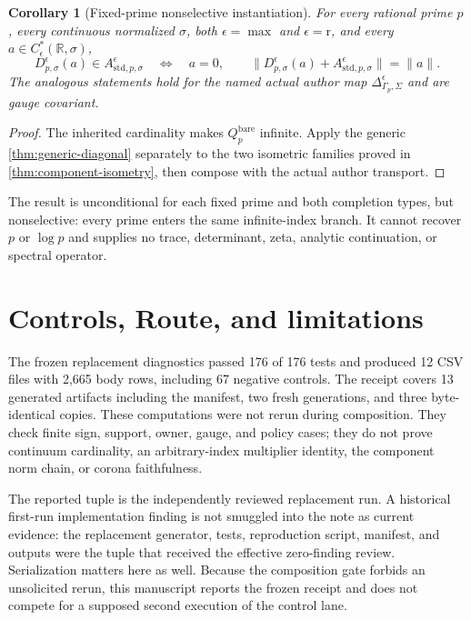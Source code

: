 \documentclass[11pt]{article}
\newtheorem{corollary}[theorem]{Corollary}
\theoremstyle{definition}
\newcommand{\R}{\mathbb R}
\begin{document}
\begin{corollary}[Fixed-prime nonselective instantiation]\label{cor:prime}
For every rational prime $p$, every continuous normalized $\sigma$, both
$\epsilon=\max$ and $\epsilon=\mathrm r$, and every
$a\in C^*_{\epsilon}(\R,\sigma)$,
\[
 D_{p,\sigma}^{\epsilon}(a)\in
 A_{\mathrm{std},p,\sigma}^{\epsilon}
 \quad\Longleftrightarrow\quad a=0,
 \qquad
 \lVert D_{p,\sigma}^{\epsilon}(a)+A_{\mathrm{std},p,\sigma}^{\epsilon}\rVert
 =\lVert a\rVert.
\]
The analogous statements hold for the named actual author map
$\Delta_{\Gamma_p,\Sigma}^{\epsilon}$ and are gauge covariant.
\end{corollary}

\begin{proof}
The inherited cardinality makes $Q_p^{\mathrm{bare}}$ infinite.  Apply the
generic \cref{thm:generic-diagonal} separately to the two isometric families
proved in \cref{thm:component-isometry}, then compose with the actual author
transport.
\end{proof}

The result is unconditional for each fixed prime and both completion types,
but nonselective: every prime enters the same infinite-index branch.  It
cannot recover $p$ or $\log p$ and supplies no trace, determinant, zeta,
analytic continuation, or spectral operator.

\section{Controls, Route, and limitations}\label{sec:controls}

The frozen replacement diagnostics passed 176 of 176 tests and produced
12 CSV files with 2,665 body rows, including 67 negative controls.  The
receipt covers 13 generated artifacts including the manifest, two fresh
generations, and three byte-identical copies.  These computations were not
rerun during composition.  They check finite sign, support, owner, gauge,
and policy cases; they do not prove continuum cardinality, an arbitrary-index
multiplier identity, the component norm chain, or corona faithfulness.

The reported tuple is the independently reviewed replacement run.  A
historical first-run implementation finding is not smuggled into the note as
current evidence: the replacement generator, tests, reproduction script,
manifest, and outputs were the tuple that received the effective
zero-finding review.  Serialization matters here as well.  Because the
composition gate forbids an unsolicited rerun, this manuscript reports the
frozen receipt and does not compete for a supposed second execution of the
control lane.
\end{document}
